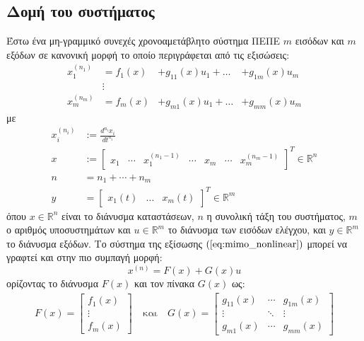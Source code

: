 \subsection{Δομή του συστήματος}
Έστω ένα μη-γραμμικό συνεχές χρονοαμετάβλητο σύστημα ΠΕΠΕ $m$ εισόδων και $m$ εξόδων σε κανονική μορφή το οποίο περιγράφεται από τις εξισώσεις:
\begin{equation}
\begin{alignedat}{3}
x_1^{(n_1)} &= f_1(x)   &+g_{11}(x) u_1 + \dots & + g_{1m}(x)u_m \\
            &\vdots & & \\
x_m^{(n_m)} &= f_m(x)  &+g_{m1}(x) u_1 + \dots & + g_{mm}(x)u_m
\end{alignedat}
\label{eq:mimo_nonlinear}
\end{equation}
με 
\begin{equation*}
\begin{split}
x_i^{(n_i)}    &:= \frac{d^{n_i} x_i }{d t^{n_i}} \\
x   &:= \begin{bmatrix} x_1 &\cdots & x_1^{(n_1-1)} & \cdots &
                               x_m &\cdots & x_m^{(n_m-1)}\end{bmatrix}^T \in \mathbb{R}^n \\
        n  &= n_1 + \cdots  + n_m \\
        y  &= \begin{bmatrix}
        x_1(t) & \dots & x_m(t)
        \end{bmatrix}^T \in \mathbb{R}^m
\end{split}
\end{equation*}
όπου $x \in \mathbb{R}^n$ είναι το διάνυσμα καταστάσεων, $n$ η συνολική τάξη του συστήματος, $m$ ο αριθμός υποσυστημάτων και $u \in \mathbb{R}^m$ το διάνυσμα των εισόδων ελέγχου, και $y \in \mathbb{R}^m $ το διάνυσμα εξόδων. Το σύστημα της εξίσωσης $(\ref{eq:mimo_nonlinear})$ μπορεί να γραφτεί και στην πιο συμπαγή μορφή:
\begin{equation}
	x^{(n)} = F(x) + G(x)u
	\label{eq:mimo_compact}
\end{equation}
ορίζοντας το διάνυσμα $F(x)$ και τον πίνακα $G(x)$ ως:
\begin{equation}
	\begin{matrix}
	F(x) = \begin{bmatrix} f_1(x) \\ \vdots \\ f_m(x) \end{bmatrix}
	& \: \text{και} \: &
	G(x) = \begin{bmatrix} g_{11}(x) & \cdots & g_{1m}(x) \\
						   \vdots    & \ddots & \vdots    \\
						   g_{m1}(x) & \cdots & g_{mm}(x)
	\end{bmatrix}
	\end{matrix}
	\label{eq:mimo_vec_functions}
\end{equation}

